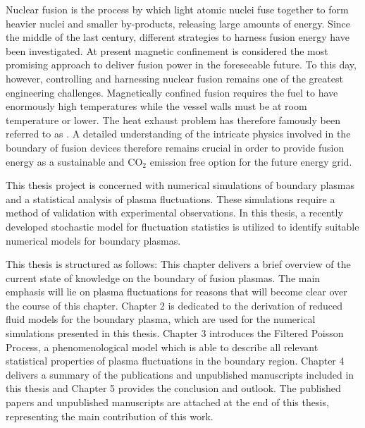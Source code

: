 Nuclear fusion is the process by which light atomic nuclei fuse together to form heavier
nuclei and smaller by-products, releasing large amounts of energy. Since the middle of
the last century, different strategies to harness fusion energy have been investigated.
At present magnetic confinement is considered the most promising approach to deliver
fusion power in the foreseeable future. To this day, however, controlling and harnessing
nuclear fusion remains one of the greatest engineering challenges. Magnetically confined
fusion requires the fuel to have enormously high temperatures while the vessel walls
must be at room temperature or lower. The heat exhaust problem has therefore famously
been referred to as  \cite{Romanelli2012}. A detailed understanding of the intricate
physics involved in the boundary of fusion devices therefore remains crucial in order to
provide fusion energy as a sustainable and $\mathrm{CO_2}$ emission free option for the
future energy grid.

This thesis project is concerned with numerical simulations of boundary plasmas and a
statistical analysis of plasma fluctuations. These simulations require a method of
validation with experimental observations. In this thesis, a recently developed
stochastic model for fluctuation statistics is utilized to identify suitable numerical
models for boundary plasmas.

This thesis is structured as follows: This chapter delivers a brief overview of the
current state of knowledge on the boundary of fusion plasmas. The main emphasis will lie
on plasma fluctuations for reasons that will become clear over the course of this
chapter. Chapter 2 is dedicated to the derivation of reduced fluid models for the
boundary plasma, which are used for the numerical simulations presented in this thesis.
Chapter 3 introduces the Filtered Poisson Process, a phenomenological model which is
able to describe all relevant statistical properties of plasma fluctuations in the
boundary region. Chapter 4 delivers a summary of the publications and unpublished
manuscripts included in this thesis and Chapter 5 provides the conclusion and outlook.
The published papers and unpublished manuscripts are attached at the end of this thesis,
representing the main contribution of this work.

